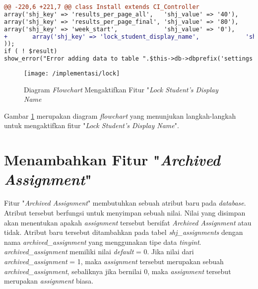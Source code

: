 \begin{lstlisting}[language=diff, caption=Perubahan kode program pada \textit{Install.php}, label=lst:21, basicstyle=\ttfamily, frame=single,
columns=fullflexible, keepspaces=true, breaklines=true]
@@ -220,6 +221,7 @@ class Install extends CI_Controller
array('shj_key' => 'results_per_page_all',   'shj_value' => '40'),
array('shj_key' => 'results_per_page_final', 'shj_value' => '80'),
array('shj_key' => 'week_start',             'shj_value' => '0'),
+   	array('shj_key' => 'lock_student_display_name',             'shj_value' => '1'),
));
if ( ! $result)
show_error("Error adding data to table ".$this->db->dbprefix('settings'));
\end{lstlisting}

\begin{figure}[H]
	\centering  
	\texttt{[image: /implementasi/lock]}  
	\caption[Diagram \textit{Flowchart} Mengaktifkan Fitur "\textit{Lock Student's Display Name}"]{Diagram \textit{Flowchart} Mengaktifkan Fitur "\textit{Lock Student's Display Name}} 
	\label{fig:ilock} 
\end{figure}
Gambar \ref{fig:ilock} merupakan diagram \textit{flowchart} yang menunjukan langkah-langkah untuk mengaktifkan fitur "\textit{Lock Student's Display Name}".

\section{Menambahkan Fitur "\textit{Archived Assignment}"}
\label{chap:arc}
Fitur "\textit{Archived Assignment}" membutuhkan sebuah atribut baru pada \textit{database}. Atribut tersebut berfungsi untuk menyimpan sebuah nilai. Nilai yang disimpan akan menentukan apakah \textit{assignment} tersebut bersifat \textit{Archived Assignment} atau tidak. Atribut baru tersebut  ditambahkan pada tabel \textit{shj\_assignments} dengan nama \textit{archived\_assignment} yang menggunakan tipe data \textit{tinyint}. \textit{archived\_assignment} memiliki nilai \textit{default} = 0. Jika nilai dari \textit{archived\_assignment} = 1, maka \textit{assignment} tersebut merupakan sebuah \textit{archived\_assignment}, sebaliknya jika bernilai 0, maka \textit{assignment} tersebut merupakan \textit{assignment} biasa.

